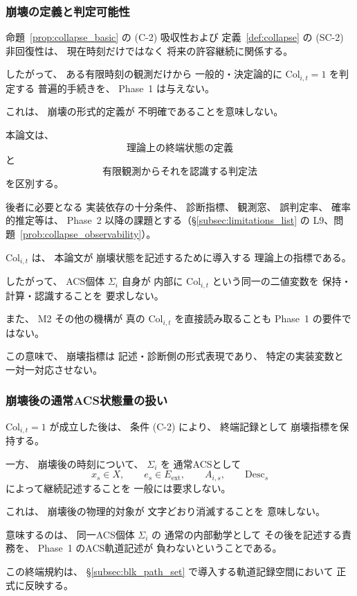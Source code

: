 \subsubsection{崩壊の定義と判定可能性}

\begin{remark}[崩壊の定義と有限観測による判定可能性は異なる]
\label{rem:collapse_definition_observability}
命題~\ref{prop:collapse_basic} の
(C-2) 吸収性および
定義~\ref{def:collapse} の
(SC-2) 非回復性は、
現在時刻だけではなく
将来の許容継続に関係する。

したがって、
ある有限時刻の観測だけから
一般的・決定論的に
$\mathrm{Col}_{i,t}=1$
を判定する
普遍的手続きを、
Phase~1 は与えない。

これは、
崩壊の形式的定義が
不明確であることを意味しない。

本論文は、
\[
  \text{理論上の終端状態の定義}
\]
と
\[
  \text{有限観測からそれを認識する判定法}
\]
を区別する。

後者に必要となる
実装依存の十分条件、
診断指標、
観測窓、
誤判定率、
確率的推定等は、
Phase~2 以降の課題とする（\S\ref{subsec:limitations_list} の L9、問題~\ref{prob:collapse_observability}）。
\end{remark}

\begin{remark}[崩壊指標はACS内部変数である必要はない]
\label{rem:collapse_indicator_description_level}
$\mathrm{Col}_{i,t}$ は、
本論文が
崩壊状態を記述するために導入する
理論上の指標である。

したがって、
ACS個体 $\Sigma_i$ 自身が
内部に
$\mathrm{Col}_{i,t}$
という同一の二値変数を
保持・計算・認識することを
要求しない。

また、
M2 その他の機構が
真の
$\mathrm{Col}_{i,t}$
を直接読み取ることも
Phase~1 の要件ではない。

この意味で、
崩壊指標は
記述・診断側の形式表現であり、
特定の実装変数と
一対一対応させない。
\end{remark}

\subsubsection{崩壊後の通常ACS状態量の扱い}

\begin{remark}[崩壊後に通常ACS動学を要求しない]
\label{rem:collapse_internal_state}
$\mathrm{Col}_{i,t}=1$
が成立した後は、
条件 (C-2) により、
終端記録として
崩壊指標を保持する。

一方、
崩壊後の時刻について、
$\Sigma_i$ を
通常ACSとして
\[
  x_s\in X,
  \qquad
  e_s\in E_{\mathrm{ext}},
  \qquad
  A_{i,s},
  \qquad
  \mathrm{Desc}_s
\]
によって継続記述することを
一般には要求しない。

これは、
崩壊後の物理的対象が
文字どおり消滅することを
意味しない。

意味するのは、
同一ACS個体 $\Sigma_i$ の
通常の内部動学として
その後を記述する責務を、
Phase~1 のACS軌道記述が
負わないということである。

この終端規約は、
\S\ref{subsec:blk_path_set}
で導入する軌道記録空間において
正式に反映する。
\end{remark}

